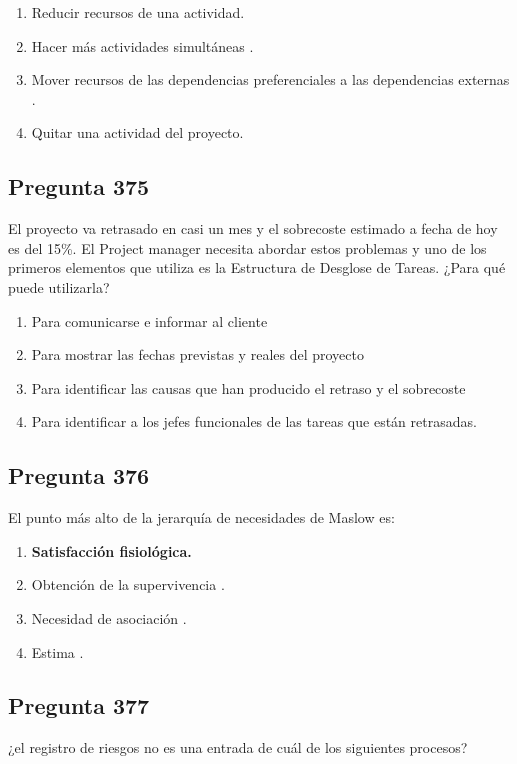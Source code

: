 \documentclass[11pt,a4paper]{article}
\begin{document}
\begin{enumerate}[label=\alph*)]
  \item Reducir recursos de una actividad.
  \item Hacer más actividades simultáneas .
  \item Mover recursos de las dependencias preferenciales a las dependencias externas .
  \item Quitar una actividad del proyecto.
\end{enumerate}

\subsection*{Pregunta 375}
El proyecto va retrasado en casi un mes y el sobrecoste estimado a fecha de hoy es del 15\%. El Project manager necesita abordar estos problemas y uno de los primeros elementos que utiliza es la Estructura de Desglose de Tareas. ¿Para qué puede utilizarla?

\begin{enumerate}[label=\alph*)]
  \item Para comunicarse e informar al cliente
  \item Para mostrar las fechas previstas y reales del proyecto
  \item Para identificar las causas que han producido el retraso y el sobrecoste
  \item Para identificar a los jefes funcionales de las tareas que están retrasadas.
\end{enumerate}

\subsection*{Pregunta 376}
El punto más alto de la jerarquía de necesidades de Maslow es:

\begin{enumerate}[label=\alph*)]
  \item \textbf{Satisfacción fisiológica.}
  \item Obtención de la supervivencia .
  \item Necesidad de asociación .
  \item Estima .
\end{enumerate}

\subsection*{Pregunta 377}
¿el registro de riesgos no es una entrada de cuál de los siguientes procesos?
\end{document}
